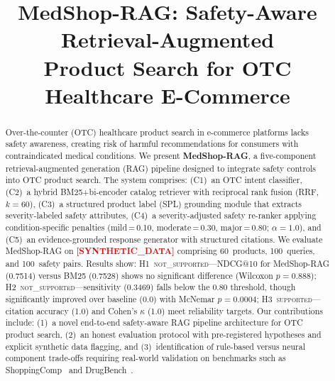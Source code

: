 \documentclass[conference]{IEEEtran}
\newcommand{\synflag}{\textcolor{red}{\textbf{[SYNTHETIC\_DATA]}}}
\begin{document}

\title{MedShop-RAG: Safety-Aware Retrieval-Augmented\\
       Product Search for OTC Healthcare E-Commerce}

\author{%
}

\maketitle

\begin{abstract}
Over-the-counter (OTC) healthcare product search in e-commerce platforms lacks
safety awareness, creating risk of harmful recommendations for consumers with
contraindicated medical conditions. We present \textbf{MedShop-RAG}, a
five-component retrieval-augmented generation (RAG) pipeline designed to
integrate safety controls into OTC product search. The system comprises:
(C1)~an OTC intent classifier, (C2)~a hybrid BM25+bi-encoder catalog retriever
with reciprocal rank fusion (RRF, $k{=}60$), (C3)~a structured product label
(SPL) grounding module that extracts severity-labeled safety attributes,
(C4)~a severity-adjusted safety re-ranker applying condition-specific penalties
(mild\,=\,0.10, moderate\,=\,0.30, major\,=\,0.80; $\alpha{=}1.0$), and
(C5)~an evidence-grounded response generator with structured citations. We
evaluate MedShop-RAG on \synflag{} comprising 60~products, 100~queries, and
100~safety pairs. Results show: H1~\textsc{not\_supported}---NDCG@10 for
MedShop-RAG (0.7514) versus BM25 (0.7528) shows no significant difference
(Wilcoxon $p{=}0.888$); H2~\textsc{not\_supported}---sensitivity (0.3469) falls
below the 0.80 threshold, though significantly improved over baseline (0.0) with
McNemar $p{=}0.0004$; H3~\textsc{supported}---citation accuracy (1.0) and
Cohen's $\kappa$ (1.0) meet reliability targets. Our contributions include:
(1)~a novel end-to-end safety-aware RAG pipeline architecture for OTC product
search, (2)~an honest evaluation protocol with pre-registered hypotheses and
explicit synthetic data flagging, and (3)~identification of rule-based versus
neural component trade-offs requiring real-world validation on benchmarks such
as ShoppingComp~\cite{shoppingcomp} and DrugBench~\cite{drugbench}.
\end{abstract}
\end{document}
